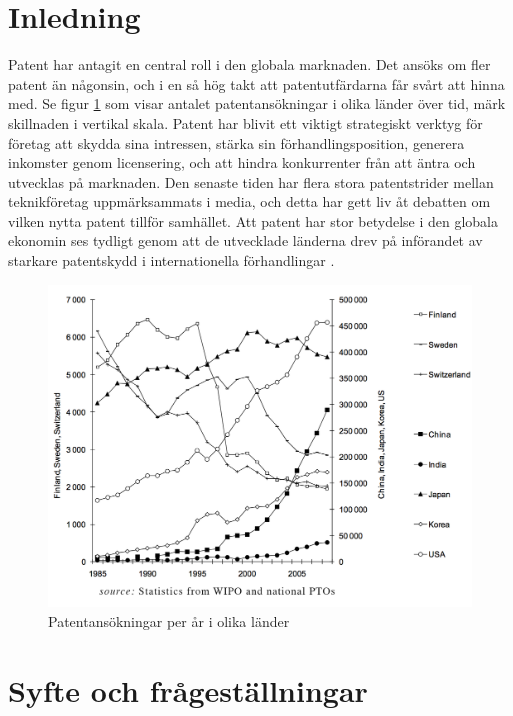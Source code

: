 
	
\section{Inledning}

Patent har antagit en central roll i den globala marknaden.
Det ansöks om fler patent än någonsin, och i en så hög takt att patentutfärdarna
får svårt att hinna med. Se figur \ref{fig:holg} som visar antalet patentansökningar i olika länder över tid, märk skillnaden i vertikal skala.
Patent har blivit ett viktigt strategiskt verktyg för företag att skydda sina
intressen, stärka sin förhandlingsposition, generera inkomster genom
licensering, och att hindra konkurrenter från att äntra och utvecklas på
marknaden. 
Den senaste tiden har flera stora patentstrider mellan teknikföretag
uppmärksammats i media, och detta har gett liv åt debatten om vilken nytta
patent tillför samhället.
Att patent har stor betydelse i den globala ekonomin ses tydligt genom att
de utvecklade länderna drev på införandet av starkare patentskydd i
internationella förhandlingar \cite{ove}. 


\begin{figure}[h!]
  \centering
  \includegraphics[width=1.15\textwidth]{../holg.png}
  
  \caption{Patentansökningar per år i olika länder\cite{holg}}
  \label{fig:holg}
\end{figure}



\section{Syfte och frågeställningar}

